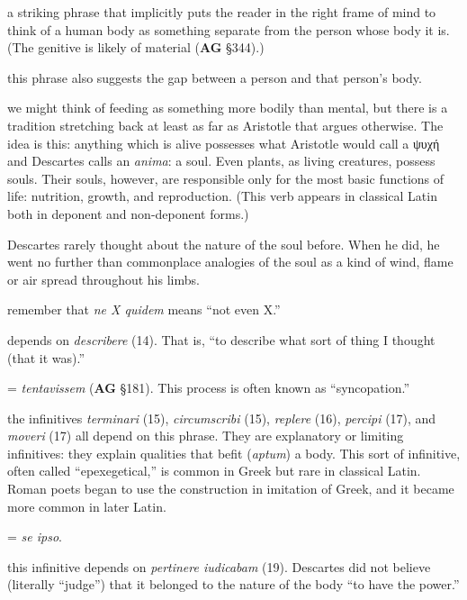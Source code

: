 \prenotes

 a striking phrase that implicitly puts the reader in the right frame of mind to think of a human body as something separate from the person whose body it is. (The genitive is likely of material (\textbf{AG} §344).)

 this phrase also suggests the gap between a person and that person's body.

 we might think of feeding as something more bodily than mental, but there is a tradition stretching back at least as far as Aristotle that argues otherwise. The idea is this: anything which is alive possesses what Aristotle would call a ψυχή and Descartes calls an \textit{anima}: a soul. Even plants, as living creatures, possess souls. Their souls, however, are responsible only for the most basic functions of life: nutrition, growth, and reproduction. (This verb appears in classical Latin both in deponent and non-deponent forms.)

 Descartes rarely thought about the nature of the soul before. When he did, he went no further than commonplace analogies of the soul as a kind of wind, flame or air spread throughout his limbs.

 remember that \textit{ne X quidem} means ``not even X.''

 depends on \textit{describere} (14). That is, ``to describe what sort of thing I thought (that it was).''

 = \textit{tentavissem} (\textbf{AG} §181). This process is often known as ``syncopation.''

 the infinitives \textit{terminari} (15), \textit{circumscribi} (15), \textit{replere} (16), \textit{percipi} (17), and \textit{moveri} (17) all depend on this phrase. They are explanatory or limiting infinitives: they explain qualities that befit (\textit{aptum}) a body. This sort of infinitive, often called ``epexegetical,'' is common in Greek but rare in classical Latin. Roman poets began to use the construction in imitation of Greek, and it became more common in later Latin.

 = \textit{se ipso}.

 this infinitive depends on \textit{pertinere iudicabam} (19). Descartes did not believe (literally ``judge'') that it belonged to the nature of the body ``to have the power.''

